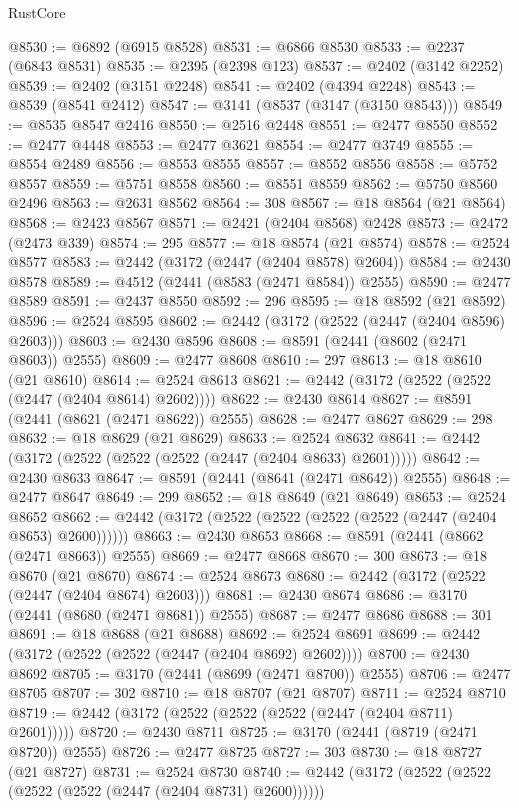 \begin{lexlean}{RustCore}
\begin{coremodule}
@8530 := @6892 (@6915 @8528)
@8531 := @6866 @8530
@8533 := @2237 (@6843 @8531)
@8535 := @2395 (@2398 @123)
@8537 := @2402 (@3142 @2252)
@8539 := @2402 (@3151 @2248)
@8541 := @2402 (@4394 @2248)
@8543 := @8539 (@8541 @2412)
@8547 := @3141 (@8537 (@3147 (@3150 @8543)))
@8549 := @8535 @8547 @2416
@8550 := @2516 @2448
@8551 := @2477 @8550
@8552 := @2477 @4448
@8553 := @2477 @3621
@8554 := @2477 @3749
@8555 := @8554 @2489
@8556 := @8553 @8555
@8557 := @8552 @8556
@8558 := @5752 @8557
@8559 := @5751 @8558
@8560 := @8551 @8559
@8562 := @5750 @8560 @2496
@8563 := @2631 @8562
@8564 := 308
@8567 := @18 @8564 (@21 @8564)
@8568 := @2423 @8567
@8571 := @2421 (@2404 @8568) @2428
@8573 := @2472 (@2473 @339)
@8574 := 295
@8577 := @18 @8574 (@21 @8574)
@8578 := @2524 @8577
@8583 := @2442 (@3172 (@2447 (@2404 @8578) @2604))
@8584 := @2430 @8578
@8589 := @4512 (@2441 (@8583 (@2471 @8584)) @2555)
@8590 := @2477 @8589
@8591 := @2437 @8550
@8592 := 296
@8595 := @18 @8592 (@21 @8592)
@8596 := @2524 @8595
@8602 := @2442 (@3172 (@2522 (@2447 (@2404 @8596) @2603)))
@8603 := @2430 @8596
@8608 := @8591 (@2441 (@8602 (@2471 @8603)) @2555)
@8609 := @2477 @8608
@8610 := 297
@8613 := @18 @8610 (@21 @8610)
@8614 := @2524 @8613
@8621 := @2442 (@3172 (@2522 (@2522 (@2447 (@2404 @8614) @2602))))
@8622 := @2430 @8614
@8627 := @8591 (@2441 (@8621 (@2471 @8622)) @2555)
@8628 := @2477 @8627
@8629 := 298
@8632 := @18 @8629 (@21 @8629)
@8633 := @2524 @8632
@8641 := @2442 (@3172 (@2522 (@2522 (@2522 (@2447 (@2404 @8633) @2601)))))
@8642 := @2430 @8633
@8647 := @8591 (@2441 (@8641 (@2471 @8642)) @2555)
@8648 := @2477 @8647
@8649 := 299
@8652 := @18 @8649 (@21 @8649)
@8653 := @2524 @8652
@8662 := @2442 (@3172 (@2522 (@2522 (@2522 (@2522 (@2447 (@2404 @8653) @2600))))))
@8663 := @2430 @8653
@8668 := @8591 (@2441 (@8662 (@2471 @8663)) @2555)
@8669 := @2477 @8668
@8670 := 300
@8673 := @18 @8670 (@21 @8670)
@8674 := @2524 @8673
@8680 := @2442 (@3172 (@2522 (@2447 (@2404 @8674) @2603)))
@8681 := @2430 @8674
@8686 := @3170 (@2441 (@8680 (@2471 @8681)) @2555)
@8687 := @2477 @8686
@8688 := 301
@8691 := @18 @8688 (@21 @8688)
@8692 := @2524 @8691
@8699 := @2442 (@3172 (@2522 (@2522 (@2447 (@2404 @8692) @2602))))
@8700 := @2430 @8692
@8705 := @3170 (@2441 (@8699 (@2471 @8700)) @2555)
@8706 := @2477 @8705
@8707 := 302
@8710 := @18 @8707 (@21 @8707)
@8711 := @2524 @8710
@8719 := @2442 (@3172 (@2522 (@2522 (@2522 (@2447 (@2404 @8711) @2601)))))
@8720 := @2430 @8711
@8725 := @3170 (@2441 (@8719 (@2471 @8720)) @2555)
@8726 := @2477 @8725
@8727 := 303
@8730 := @18 @8727 (@21 @8727)
@8731 := @2524 @8730
@8740 := @2442 (@3172 (@2522 (@2522 (@2522 (@2522 (@2447 (@2404 @8731) @2600))))))

\end{coremodule}
\end{lexlean}
